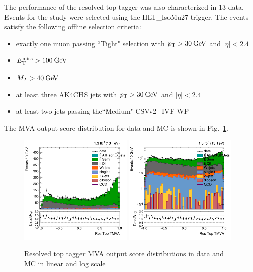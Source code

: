 The performance of the resolved top tagger was also characterized in 13\:\TeV\: data. Events for the study were selected using the HLT\_IsoMu27 trigger. The events satisfy the following offline selection criteria:

\begin{itemize}
\item exactly one muon passing ``Tight" selection with $p_\mathrm{T}>30\:\mathrm{Ge\kern -0.1em V}$ and $|\eta|<2.4$ 
\item $E_\mathrm{T}^{\mathrm{miss}}>100\: \mathrm{Ge\kern -0.1em V}$
\item $M_T>40\: \mathrm{Ge\kern -0.1em V}$
\item at least three AK4CHS jets with $p_\mathrm{T}>30\:\mathrm{Ge\kern -0.1em V}$ and $|\eta|<2.4$ 
\item at least two jets passing the``Medium" CSVv2+IVF WP 
\end{itemize}

The MVA output score distribution for data and MC is shown in Fig.~\ref{fig:score}. 

\begin{figure}[htbp]
	\centering
	\includegraphics[width=0.48\textwidth]{figures/semilep_1tightmuo_resolved_3ormorejets_2ormorejetWPm_pfmetmore100_pfmtmore40_trigrequestonMC_qgsmearedwith8TeVrecipe_Oct302015/hResTopMVAlinear.png}
	\includegraphics[width=0.48\textwidth]{figures/semilep_1tightmuo_resolved_3ormorejets_2ormorejetWPm_pfmetmore100_pfmtmore40_trigrequestonMC_qgsmearedwith8TeVrecipe_Oct302015/hResTopMVA.png}
	\caption{Resolved top tagger MVA output score distributions in data and MC in linear and log scale}
	\label{fig:score}
\end{figure}

